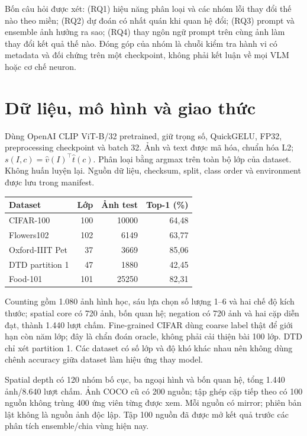 \documentclass[11pt,a4paper]{article}
\begin{document}
Bốn câu hỏi được xét: (RQ1) hiệu năng phân loại và các nhóm lỗi thay đổi thế nào theo miền; (RQ2) dự đoán có nhất quán khi quan hệ đổi; (RQ3) prompt và ensemble ảnh hưởng ra sao; (RQ4) thay ngôn ngữ prompt trên cùng ảnh làm thay đổi kết quả thế nào. Đóng góp của nhóm là chuỗi kiểm tra hành vi có metadata và đối chứng trên một checkpoint, không phải kết luận về mọi VLM hoặc cơ chế neuron.

\newpage
\section{Dữ liệu, mô hình và giao thức}
Dùng OpenAI CLIP ViT-B/32 pretrained, giữ trọng số, QuickGELU, FP32, preprocessing checkpoint và batch 32. Ảnh và text được mã hóa, chuẩn hóa L2; $s(I,c)=\hat v(I)^\top\hat t(c)$. Phân loại bằng argmax trên toàn bộ lớp của dataset. Không huấn luyện lại. Nguồn dữ liệu, checksum, split, class order và environment được lưu trong manifest.

\begin{center}\small
{}
\begin{tabular}{@{}lrrr@{}}\toprule
Dataset & Lớp & Ảnh test & Top-1 (\%)\\\midrule
CIFAR-100 & 100 & 10000 & 64,48\\
Flowers102 & 102 & 6149 & 63,77\\
Oxford-IIIT Pet & 37 & 3669 & 85,06\\
DTD partition 1 & 47 & 1880 & 42,45\\
Food-101 & 101 & 25250 & 82,31\\
\bottomrule\end{tabular}\end{center}

Counting gồm 1.080 ảnh hình học, sáu lựa chọn số lượng 1--6 và hai chế độ kích thước; spatial core có 720 ảnh, bốn quan hệ; negation có 720 ảnh và hai cặp diễn đạt, thành 1.440 lượt chấm. Fine-grained CIFAR dùng coarse label thật để giới hạn còn năm lớp; đây là chẩn đoán oracle, không phải cải thiện bài 100 lớp. DTD chỉ xét partition 1. Các dataset có số lớp và độ khó khác nhau nên không dùng chênh accuracy giữa dataset làm hiệu ứng thay model.

Spatial depth có 120 nhóm bố cục, ba ngoại hình và bốn quan hệ, tổng 1.440 ảnh/8.640 lượt chấm. Ảnh COCO cũ có 200 nguồn; tập ghép cặp tiếp theo có 100 nguồn không trùng 400 ứng viên từng được xem. Mỗi nguồn có mirror; phiên bản lật không là nguồn ảnh độc lập. Tập 100 nguồn đã được mở kết quả trước các phân tích ensemble/chia vùng hiện nay.
\end{document}
